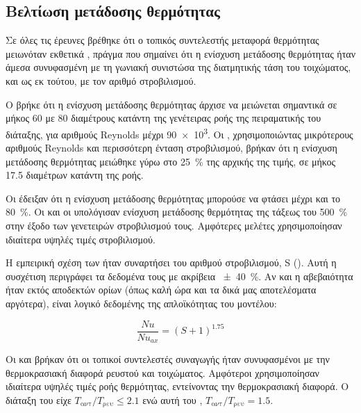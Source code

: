\subsection{Βελτίωση μετάδοσης θερμότητας}

\noindent Σε όλες τις έρευνες βρέθηκε ότι ο τοπικός συντελεστής μεταφορά θερμότητας μειωνόταν εκθετικά \parencites{1970_Blackwelder}{1973_KlepperO._CONF}{1975_Hay}{1984_Prata}, πράγμα που σημαίνει ότι η ενίσχυση μετάδοσης θερμότητας ήταν άμεσα συνυφασμένη με τη γωνιακή συνιστώσα της διατμητικής τάση του τοιχώματος, και ως εκ τούτου, με τον αριθμό στροβιλισμού.

Ο \citeauthor{1970_Blackwelder} \cite{1970_Blackwelder} βρήκε ότι η ενίσχυση μετάδοσης θερμότητας άρχισε να μειώνεται σημαντικά σε μήκος 60 με 80 διαμέτρους κατάντη της γενέτειρας ροής της πειραματικής του διάταξης, για αριθμούς Reynolds μέχρι \num{90e+3}. Οι \citeauthor{1975_Hay} \cite{1975_Hay}, χρησιμοποιώντας μικρότερους αριθμούς Reynolds και περισσότερη ένταση στροβιλισμού, βρήκαν ότι η ενίσχυση μετάδοσης θερμότητας μειώθηκε γύρω στο \qty{25}{\percent} της αρχικής της τιμής, σε μήκος 17.5 διαμέτρων κατάντη της ροής. 

Οι \citeauthor{1975_Zaherzadeh} \cite{1975_Zaherzadeh} έδειξαν ότι η ενίσχυση μετάδοσης θερμότητας μπορούσε να φτάσει μέχρι και το \qty{80}{\percent}. Οι \citeauthor{1975_Hay} \cite{1975_Hay} και οι \citeauthor{1984_Prata} \cite{1984_Prata} υπολόγισαν ενίσχυση μετάδοσης θερμότητας της τάξεως του \qty{500}{\percent} στην έξοδο των γενετειρών στροβιλισμού τους. Αμφότερες μελέτες χρησιμοποίησαν ιδιαίτερα υψηλές τιμές στροβιλισμού.

Η εμπειρική σχέση των \citeauthor{1975_Hay} \cite{1975_Hay} ήταν συναρτήσει του αριθμού στροβιλισμού, S (). Αυτή η συσχέτιση περιγράφει τα δεδομένα τους με ακρίβεια \qty{\pm 40}{\percent}. Αν και η αβεβαιότητα ήταν εκτός αποδεκτών ορίων (όπως καλή ώρα και τα δικά μας αποτελέσματα αργότερα), είναι λογικό δεδομένης της απλοϊκότητας του μοντέλου:
 
\begin{equation}\label{eq:hay}
\displaystyle\frac{Nu}{Nu_{ax}} = \left(S + 1\right)^{1.75}
\end{equation}

\noindent Οι \citeauthor{1970_Blackwelder} \cite{1970_Blackwelder} και \citeauthor{1973_KlepperO._CONF} \cite{1973_KlepperO._CONF} βρήκαν ότι οι τοπικοί συντελεστές συναγωγής ήταν συνυφασμένοι με την θερμοκρασιακή διαφορά ρευστού και τοιχώματος. Αμφότεροι χρησιμοποίησαν ιδιαίτερα υψηλές τιμές ροής θερμότητας, εντείνοντας την θερμοκρασιακή διαφορά. O διάταξη του \citeauthor{1970_Blackwelder} είχε $T_{\text{αντ}}/Τ_{\text{ρευ}} \le 2.1$ ενώ αυτή του \citeauthor{1973_KlepperO._CONF}, $T_{\text{αντ}}/Τ_{\text{ρευ}} = 1.5$.


